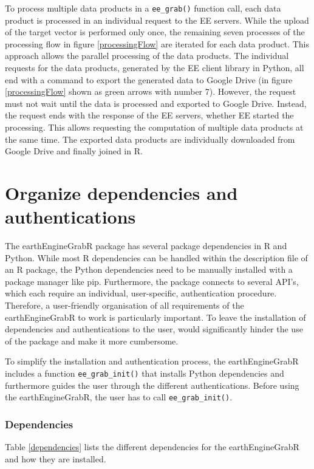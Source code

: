 To process multiple data products in a \texttt{ee\_grab()} function call, each data product is processed in an individual request to the EE servers. While the upload of the target vector is performed only once, the remaining seven processes of the processing flow in figure \ref{processingFlow} are iterated for each data product. This approach allows the parallel processing of the data products. The individual requests for the data products, generated by the EE client library in Python, all end with a command to export the generated data to Google Drive (in figure \ref{processingFlow} shown as green arrows with number 7). However, the request must not wait until the data is processed and exported to Google Drive. Instead, the request ends with the response of the EE servers, whether EE started the processing. 
This allows requesting the computation of multiple data products at the same time. The exported data products are individually downloaded from Google Drive and finally joined in R.


\section{Organize dependencies and authentications}


The earthEngineGrabR package has several package dependencies in R and Python. While most R dependencies can be handled within the description file of an R package, the Python dependencies need to be manually installed with a package manager like pip. Furthermore, the package connects to several API's, which each require an individual, user-specific, authentication procedure. Therefore, a user-friendly organisation of all requirements of the earthEngineGrabR to work is particularly important. To leave the installation of dependencies and authentications to the user, would significantly hinder the use of the package and make it more cumbersome. 


To simplify the installation and authentication process, the earthEngineGrabR includes a function \texttt{ee\_grab\_init()} that installs Python dependencies and furthermore guides the user through the different authentications. Before using the earthEngineGrabR, the user has to call \texttt{ee\_grab\_init()}. 

\subsubsection{Dependencies}

Table \ref*{dependencies} lists the different dependencies for the earthEngineGrabR and how they are installed. 

